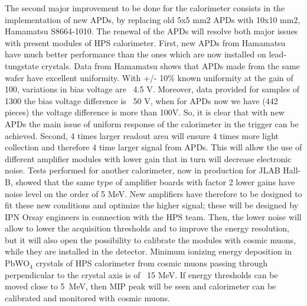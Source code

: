 The second major improvement to be done for the calorimeter consists in the implementation of new APDs, by replacing old 5x5 mm2 APDs with 10x10 mm2, Hamamatsu S8664-1010. The renewal of the APDs will resolve both major issues with present modules of HPS calorimeter. First, new APDs from Hamamatsu have much better performance than the ones which are now installed on lead-tungstate crystals. Data from Hamamatsu shows that APDs made from the same wafer have excellent uniformity. With +/- 10\% known uniformity at the gain of 100, variations in bias voltage are ~4.5 V. Moreover, data provided for samples of 1300 the bias voltage difference is ~50 V, when for APDs now we have (442 pieces) the voltage difference is more than 100V. So, it is clear that with new APDs the main issue of uniform response of the calorimeter in the trigger can be achieved. Second, 4 times larger readout area will ensure 4 times more light collection and therefore 4 time larger signal from APDs. This will allow the use of different amplifier modules with lower gain that in turn will decrease electronic noise. Tests performed for another calorimeter, now in production for JLAB Hall-B, showed that the same type of amplifier boards with factor 2 lower gains have noise level on the order of 5 MeV. New amplifiers have therefore to be designed to fit these new conditions and optimize the higher signal; these will be designed by IPN Orsay engineers in connection with the HPS team. Then, the lower noise will allow to lower the acquisition thresholds and to improve the energy resolution, but it will also open the possibility to calibrate the modules with cosmic muons, while they are installed in the detector. Minimum ionizing energy deposition in PbWO$_4$ crystals of HPS calorimeter from cosmic muons passing through perpendicular to the crystal axis is of ~15 MeV. If energy thresholds can be moved close to 5~MeV, then MIP peak will be seen and calorimeter can be calibrated and monitored with cosmic muons.

